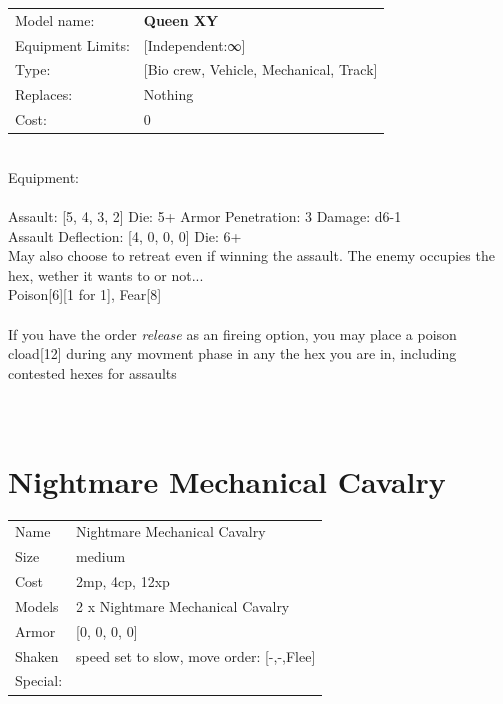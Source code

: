 {\noindent
\begin{tabular}{ll}
Model name: &{\bf Queen XY } \\
Equipment Limits: &[Independent:∞] \\
Type: &[Bio crew, Vehicle, Mechanical, Track] \\
Replaces: &Nothing \\
Cost: & 0\\
\end{tabular}
\ \\
Equipment:  \\
\ \\
Assault: [5, 4, 3, 2] Die: 5+ Armor Penetration: 3 Damage: d6-1 \\
Assault Deflection: [4, 0, 0, 0] Die: 6+\\
\indent May also choose to retreat even if winning the assault. The enemy occupies the hex, wether it wants to or not...\\ 
Poison[6][1 for 1], Fear[8]\\ 
 
\ \\
If you have the order {{\it release}} as an fireing option, you may place a poison cload[12] during any movment phase in any the hex you are in, including contested hexes for assaults\\ 

\ \\
 
\ \\













\clearpage

\section{ Nightmare Mechanical Cavalry }

\begin{tabular}{ll}
  Name & Nightmare Mechanical Cavalry \\
  Size & medium\\
  Cost & 2mp, 4cp, 12xp\\
  Models & 2 x Nightmare Mechanical Cavalry\\
  Armor & [0, 0, 0, 0]\\
  Shaken & speed set to slow, move order: [-,-,Flee]\\
  Special: \\
\end{tabular}

}
